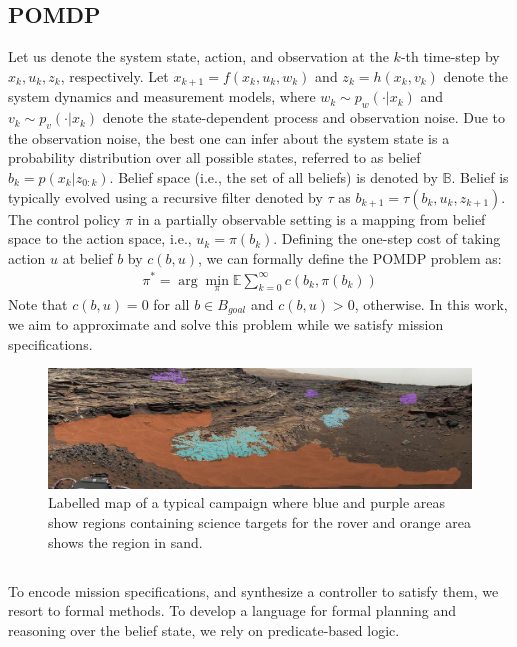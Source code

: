 \documentclass[conference]{IEEEtran}
\begin{document}
	\subsection{POMDP}\label{sec:POMDP}
	Let us denote the system state, action, and observation at the $k$-th time-step by $x_k, u_k, z_k$, respectively. Let $x_{k+1}=f(x_k,u_k,w_k)$ and $z_k=h(x_k,v_k)$ denote the system dynamics and measurement models, where $w_k\sim p_w(\cdot|x_k)$ and $v_k\sim p_v(\cdot|x_k)$ denote the state-dependent process and observation noise. Due to the observation noise, the best one can infer about the system state is a probability distribution over all possible states, referred to as belief $b_k=p(x_k|z_{0:k})$. Belief space (i.e., the set of all beliefs) is denoted by $\mathbb{B}$. Belief is typically evolved using a recursive filter denoted by $\tau$ as $b_{k+1}=\tau(b_k,u_k,z_{k+1})$. The control policy $\pi$ in a partially observable setting is a mapping from belief space to the action space, i.e., $u_k=\pi(b_k)$. Defining the one-step cost of taking action $u$ at belief $b$ by $c(b,u)$, we can formally define the POMDP problem as: 
    \begin{align}
    \pi^*=\arg\min_\pi\mathbb{E}\sum_{k=0}^{\infty}c(b_k,\pi(b_k))
    \end{align}
    Note that $c(b,u)=0$ for all $b\in B_{goal}$ and $c(b,u)>0$, otherwise. In this work, we aim to approximate and solve this problem while we satisfy mission specifications.
    
    
	\begin{figure}[t!]
    	\centering
    	\includegraphics[width=2\columnwidth]{figs/MarsLabelledWithSand.png}
    	\caption{Labelled map of a typical campaign where blue and purple areas show regions containing science targets for the rover and orange area shows the region in sand.}
    	\label{fig:Scenario}
    \end{figure}
    
	\subsection{\DTL}\label{sec:DTL}
    To encode mission specifications, and synthesize a controller to satisfy them, we resort to formal methods. To develop a language for formal planning and reasoning over the belief state, we rely on predicate-based logic.
    
\end{document}
